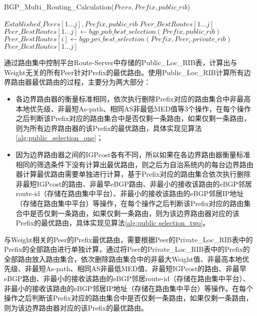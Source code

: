 \begin{algorithm}[htb]
    \caption{BGP\_Multi\_Routing\_Calculation($Peers, Prefix, public\_rib$)}%
    \label{alg:multi_routing_calculation}
    \begin{algorithmic}[1]%
        \REQUIRE
        $Established\_Peers[1...j], Prefix, public\_rib$
        \ENSURE
        $Peer\_BestRoutes[1...j]$
        \STATE $Peer\_BestRoutes[1...j] \gets  bgp\_pub\_best\_selection(Prefix, public\_rib)$
        \STATE $Peer\_BestRoutes[i] \gets  bgp\_pri\_best\_selection(Prefix, Peer_i.private\_rib)$
        \ENDIF
        \ENDFOR
        \RETURN $Peer\_BestRoutes[1...j]$
    \end{algorithmic}
\end{algorithm}

通过路由集中控制平台Route-Server中存储的Public\_Loc\_RIB表，计算出与Weight无关的所有Peer针对Prefix的最优路由。使用Public\_Loc\_RIB计算所有边界路由器最优路由的过程，主要分为两大部分：
\begin{itemize}
  \item 各边界路由器的衡量标准相同，依次执行删除Prefix对应的路由集合中非最高本地优先级、非最短As-path、相同AS非最低MED值等3个操作，在每个操作之后判断该Prefix对应的路由集合中是否仅剩一条路由，如果仅剩一条路由，则为所有边界路由器的该Prefix的最优路由，具体实现见算法\ref{alg:public_selection_one}；
  \item 因为边界路由器之间的IGPcost各有不同，所以如果在各边界路由器衡量标准相同的筛选条件下没有计算出最优路由，则之后为自治系统内的每台边界路由器计算最优路由需要单独进行计算，基于Prefix对应的路由集合依次执行删除非最短IGPcost的路由、非最早eBGP路由、非最小的接收该路由的eBGP邻居route-id（存储在路由集中平台）、非最小的接收该路由的eBGP邻居IP地址（存储在路由集中平台）等操作，在每个操作之后判断该Prefix对应的路由集合中是否仅剩一条路由，如果仅剩一条路由，则为该边界路由器对应的该Prefix的最优路由，具体实现见算法\ref{alg:public selection_two}。
\end{itemize}


与Weight相关的Peer的Prefix最优路由，需要根据Peer的Private\_Loc\_RIB表中的Prefix的全部路由进行单独计算，通过将Peer的Private\_Loc\_RIB表中的Prefix的全部路由放入路由集合，依次删除路由集合中的非最大Weight值、非最高本地优先级、非最短As-path、相同AS非最低MED值、非最短IGPcost的路由、非最早eBGP路由、非最小的接收该路由的eBGP邻居route-id（存储在路由集中平台）、非最小的接收该路由的eBGP邻居IP地址（存储在路由集中平台）等操作。在每个操作之后判断该Prefix对应的路由集合中是否仅剩一条路由，如果仅剩一条路由，则为该边界路由器对应的该Prefix的最优路由。

